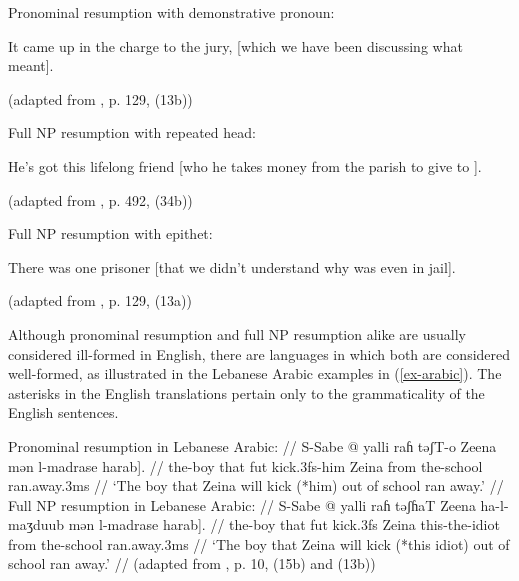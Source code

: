 \ex
Pronominal resumption with demonstrative pronoun: \par\nobreak\vspace{5pt}
It came up in the charge to the jury, [which we have been discussing what  meant]. \par\nobreak\vspace{5pt} \label{ex-nominal2}
\hfill (adapted from \cite{kroch1981}, p. 129, (13b))
\xe

\ex
Full NP resumption with repeated head: \par\nobreak\vspace{5pt}
He's got this lifelong friend [who he takes money from the parish to give to ]. \par\nobreak\vspace{5pt} \label{ex-nominal3}
\hfill (adapted from \cite{prince1990}, p. 492, (34b))
\xe

\ex
Full NP resumption with epithet: \par\nobreak\vspace{5pt}
There was one prisoner [that we didn't understand why  was even in jail]. \par\nobreak\vspace{5pt} \label{ex-nominal4}
\hfill (adapted from \cite{kroch1981}, p. 129, (13a))
\xe

Although pronominal resumption and full NP resumption alike are usually considered ill-formed in English, there are languages in which both are considered well-formed, as illustrated in the Lebanese Arabic examples in (\ref{ex-arabic}). The asterisks in the English translations pertain only to the grammaticality of the English sentences.

\pex\label{ex-arabic}
\a
\begingl
\glpreamble Pronominal resumption in Lebanese Arabic: //
\gla S-Sabe \nogloss{[} @ yalli raɦ təʃT-o Zeena mən l-madrase harab]. //
\glb the-boy that {\sc fut} kick.{\sc 3fs}-him Zeina from the-school ran.away.{\sc 3ms} //
\glft `The boy that Zeina will kick (*him) out of school ran away.'\label{ex-arabic-a} //
\endgl 
\a
\begingl
\glpreamble Full NP resumption in Lebanese Arabic: //
\gla S-Sabe \nogloss{[} @ yalli raɦ təʃɦaT Zeena ha-l-maʒduub mən l-madrase harab]. //
\glb the-boy that {\sc fut} kick.{\sc 3fs} Zeina this-the-idiot from the-school ran.away.{\sc 3ms} //
\glft `The boy that Zeina will kick (*this idiot) out of school ran away.'\label{ex-arabic-b} // 
\vspace{5pt}
\hfill (adapted from \cite{aoun.choueiri2000}, p. 10, (15b) and (13b))
\endgl 
\xe

